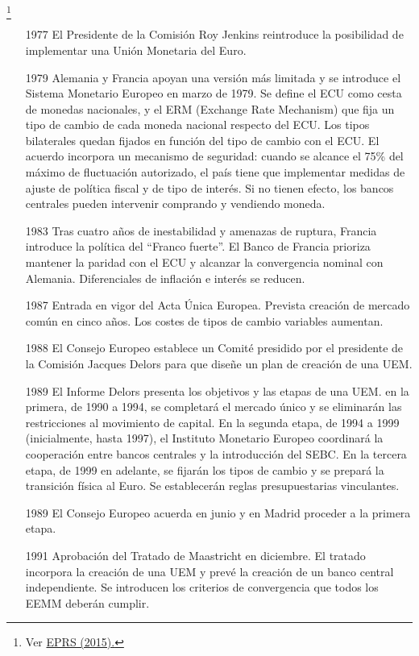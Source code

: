 \documentclass{nuevotema}
\begin{document}
\footnote{Ver \href{https://www.europarl.europa.eu/RegData/etudes/BRIE/2015/551325/EPRS_BRI(2015)551325_EN.pdf}{EPRS (2015).}}

\begin{itemize}
	\item[1977] El Presidente de la Comisión Roy Jenkins reintroduce la posibilidad de implementar una Unión Monetaria del Euro. 
	\item[1979] Alemania y Francia apoyan una versión más limitada y se introduce el Sistema Monetario Europeo en marzo de 1979. Se define el ECU como cesta de monedas nacionales, y el ERM (Exchange Rate Mechanism) que fija un tipo de cambio de cada moneda nacional respecto del ECU. Los tipos bilaterales quedan fijados en función del tipo de cambio con el ECU. El acuerdo incorpora un mecanismo de seguridad: cuando se alcance el 75\% del máximo de fluctuación autorizado, el país tiene que implementar medidas de ajuste de política fiscal y de tipo de interés. Si no tienen efecto, los bancos centrales pueden intervenir comprando y vendiendo moneda. 
	\item[1983] Tras cuatro años de inestabilidad y amenazas de ruptura, Francia introduce la política del ``Franco fuerte''. El Banco de Francia prioriza mantener la paridad con el ECU y alcanzar la convergencia nominal con Alemania. Diferenciales de inflación e interés se reducen.
	\item[1987] Entrada en vigor del Acta Única Europea. Prevista creación de mercado común en cinco años. Los costes de tipos de cambio variables aumentan. 
	\item[1988] El Consejo Europeo establece un Comité presidido por el presidente de la Comisión Jacques Delors para que diseñe un plan de creación de una UEM. 
	\item[1989] El Informe Delors presenta los objetivos y las etapas de una UEM. en la primera, de 1990 a 1994, se completará el mercado único y se eliminarán las restricciones al movimiento de capital. En la segunda etapa, de 1994 a 1999 (inicialmente, hasta 1997), el Instituto Monetario Europeo coordinará la cooperación entre bancos centrales y la introducción del SEBC. En la tercera etapa, de 1999 en adelante, se fijarán los tipos de cambio y se prepará la transición física al Euro. Se establecerán reglas presupuestarias vinculantes. 
	\item[1989] El Consejo Europeo acuerda en junio y en Madrid proceder a la primera etapa. 
	\item[1991] Aprobación del Tratado de Maastricht en diciembre. El tratado incorpora la creación de una UEM y prevé la creación de un banco central independiente. Se introducen los criterios de convergencia que todos los EEMM deberán cumplir. 

\end{itemize}
\end{document}
